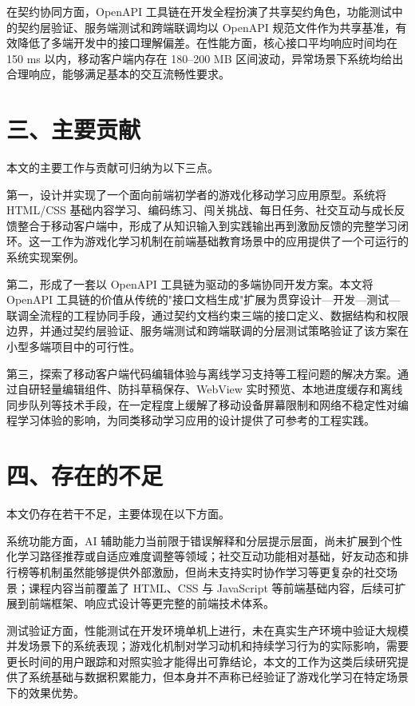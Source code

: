 \begin{conclusion}
在契约协同方面，OpenAPI 工具链在开发全程扮演了共享契约角色，功能测试中的契约层验证、服务端测试和跨端联调均以 OpenAPI 规范文件作为共享基准，有效降低了多端开发中的接口理解偏差。在性能方面，核心接口平均响应时间均在 150 ms 以内，移动客户端内存在 180--200 MB 区间波动，异常场景下系统均给出合理响应，能够满足基本的交互流畅性要求。

\section*{三、主要贡献}

本文的主要工作与贡献可归纳为以下三点。

第一，设计并实现了一个面向前端初学者的游戏化移动学习应用原型。系统将 HTML/CSS 基础内容学习、编码练习、闯关挑战、每日任务、社交互动与成长反馈整合于移动客户端中，形成了从知识输入到实践输出再到激励反馈的完整学习闭环。这一工作为游戏化学习机制在前端基础教育场景中的应用提供了一个可运行的系统实现案例。

第二，形成了一套以 OpenAPI 工具链为驱动的多端协同开发方案。本文将 OpenAPI 工具链的价值从传统的"接口文档生成"扩展为贯穿设计—开发—测试—联调全流程的工程协同手段，通过契约文档约束三端的接口定义、数据结构和权限边界，并通过契约层验证、服务端测试和跨端联调的分层测试策略验证了该方案在小型多端项目中的可行性。

第三，探索了移动客户端代码编辑体验与离线学习支持等工程问题的解决方案。通过自研轻量编辑组件、防抖草稿保存、WebView 实时预览、本地进度缓存和离线同步队列等技术手段，在一定程度上缓解了移动设备屏幕限制和网络不稳定性对编程学习体验的影响，为同类移动学习应用的设计提供了可参考的工程实践。

\section*{四、存在的不足}

本文仍存在若干不足，主要体现在以下方面。

系统功能方面，AI 辅助能力当前限于错误解释和分层提示层面，尚未扩展到个性化学习路径推荐或自适应难度调整等领域；社交互动功能相对基础，好友动态和排行榜等机制虽然能够提供外部激励，但尚未支持实时协作学习等更复杂的社交场景；课程内容当前覆盖了 HTML、CSS 与 JavaScript 等前端基础内容，后续可扩展到前端框架、响应式设计等更完整的前端技术体系。

测试验证方面，性能测试在开发环境单机上进行，未在真实生产环境中验证大规模并发场景下的系统表现；游戏化机制对学习动机和持续学习行为的实际影响，需要更长时间的用户跟踪和对照实验才能得出可靠结论，本文的工作为这类后续研究提供了系统基础与数据积累能力，但本身并不声称已经验证了游戏化学习在特定场景下的效果优势。


\end{conclusion}
